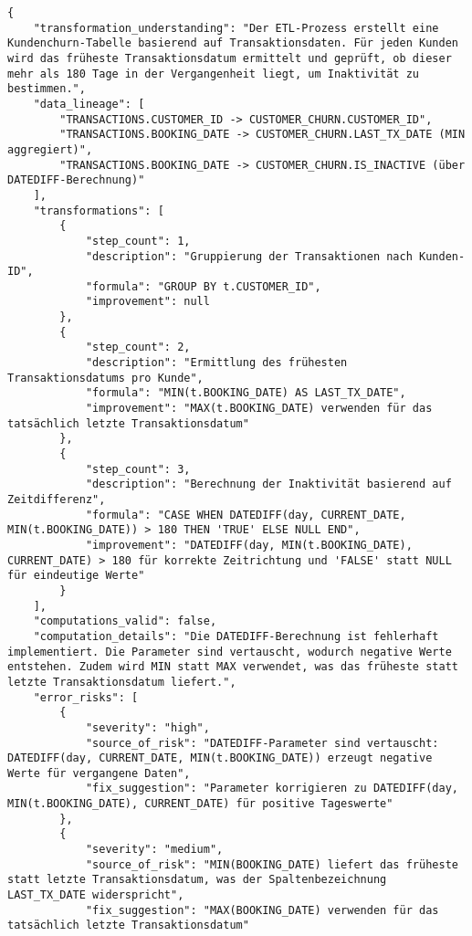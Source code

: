 \begin{lstlisting}[caption={Ausgabe: Claude Sonnet 4 Anwendungsfall 7 Robustheitsdurchlauf},label={claude_case7_prompt3}]
{
    "transformation_understanding": "Der ETL-Prozess erstellt eine Kundenchurn-Tabelle basierend auf Transaktionsdaten. Für jeden Kunden wird das früheste Transaktionsdatum ermittelt und geprüft, ob dieser mehr als 180 Tage in der Vergangenheit liegt, um Inaktivität zu bestimmen.",
    "data_lineage": [
        "TRANSACTIONS.CUSTOMER_ID -> CUSTOMER_CHURN.CUSTOMER_ID",
        "TRANSACTIONS.BOOKING_DATE -> CUSTOMER_CHURN.LAST_TX_DATE (MIN aggregiert)",
        "TRANSACTIONS.BOOKING_DATE -> CUSTOMER_CHURN.IS_INACTIVE (über DATEDIFF-Berechnung)"
    ],
    "transformations": [
        {
            "step_count": 1,
            "description": "Gruppierung der Transaktionen nach Kunden-ID",
            "formula": "GROUP BY t.CUSTOMER_ID",
            "improvement": null
        },
        {
            "step_count": 2,
            "description": "Ermittlung des frühesten Transaktionsdatums pro Kunde",
            "formula": "MIN(t.BOOKING_DATE) AS LAST_TX_DATE",
            "improvement": "MAX(t.BOOKING_DATE) verwenden für das tatsächlich letzte Transaktionsdatum"
        },
        {
            "step_count": 3,
            "description": "Berechnung der Inaktivität basierend auf Zeitdifferenz",
            "formula": "CASE WHEN DATEDIFF(day, CURRENT_DATE, MIN(t.BOOKING_DATE)) > 180 THEN 'TRUE' ELSE NULL END",
            "improvement": "DATEDIFF(day, MIN(t.BOOKING_DATE), CURRENT_DATE) > 180 für korrekte Zeitrichtung und 'FALSE' statt NULL für eindeutige Werte"
        }
    ],
    "computations_valid": false,
    "computation_details": "Die DATEDIFF-Berechnung ist fehlerhaft implementiert. Die Parameter sind vertauscht, wodurch negative Werte entstehen. Zudem wird MIN statt MAX verwendet, was das früheste statt letzte Transaktionsdatum liefert.",
    "error_risks": [
        {
            "severity": "high",
            "source_of_risk": "DATEDIFF-Parameter sind vertauscht: DATEDIFF(day, CURRENT_DATE, MIN(t.BOOKING_DATE)) erzeugt negative Werte für vergangene Daten",
            "fix_suggestion": "Parameter korrigieren zu DATEDIFF(day, MIN(t.BOOKING_DATE), CURRENT_DATE) für positive Tageswerte"
        },
        {
            "severity": "medium",
            "source_of_risk": "MIN(BOOKING_DATE) liefert das früheste statt letzte Transaktionsdatum, was der Spaltenbezeichnung LAST_TX_DATE widerspricht",
            "fix_suggestion": "MAX(BOOKING_DATE) verwenden für das tatsächlich letzte Transaktionsdatum"

\end{lstlisting}
